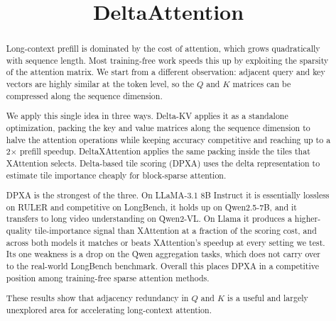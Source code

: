 \renewcommand{\topfraction}{0.9}
\renewcommand{\bottomfraction}{0.8}
\renewcommand{\textfraction}{0.07}
\renewcommand{\floatpagefraction}{0.75}
\setcounter{topnumber}{3}
\setcounter{bottomnumber}{2}
\setcounter{totalnumber}{5}

\title{DeltaAttention}
\author{}
\date{}


\maketitle

\begin{abstract}
Long-context prefill is dominated by the cost of attention, which grows quadratically with sequence length. Most training-free work speeds this up by exploiting the sparsity of the attention matrix. We start from a different observation: adjacent query and key vectors are highly similar at the token level, so the $Q$ and $K$ matrices can be compressed along the sequence dimension.

We apply this single idea in three ways. Delta-KV applies it as a standalone optimization, packing the key and value matrices along the sequence dimension to halve the attention operations while keeping accuracy competitive and reaching up to a 2$\times$ prefill speedup. DeltaXAttention applies the same packing inside the tiles that XAttention selects. Delta-based tile scoring (DPXA) uses the delta representation to estimate tile importance cheaply for block-sparse attention.

DPXA is the strongest of the three. On LLaMA-3.1 8B Instruct it is essentially lossless on RULER and competitive on LongBench, it holds up on Qwen2.5-7B, and it transfers to long video understanding on Qwen2-VL. On Llama it produces a higher-quality tile-importance signal than XAttention at a fraction of the scoring cost, and across both models it matches or beats XAttention's speedup at every setting we test. Its one weakness is a drop on the Qwen aggregation tasks, which does not carry over to the real-world LongBench benchmark. Overall this places DPXA in a competitive position among training-free sparse attention methods.

These results show that adjacency redundancy in $Q$ and $K$ is a useful and largely unexplored area for accelerating long-context attention.
\end{abstract}
\newpage

